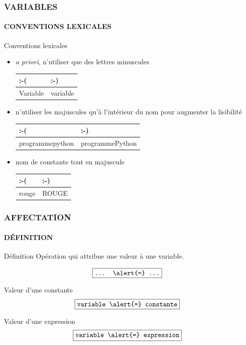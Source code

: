 \begin{frame}
\frametitle{\uppercase{Variables}}
\framesubtitle{\uppercase{Conventions lexicales}}
\begin{block}{Conventions lexicales}
\begin{itemize}
\item {\em a priori}, n'utiliser que des lettres minuscules\\
	{\tt \begin{tabular}[t]{|l|l|}
	\hline
	\alert{:-(} & \alert{:-)} \\
	\hline
	Variable & variable \\
	\hline
	\end{tabular}}
\item n'utiliser les majuscules qu'à l'intérieur du nom pour augmenter la lisibilité\\
	{\tt \begin{tabular}[t]{|l|l|}
	\hline
	\alert{:-(} & \alert{:-)} \\
	\hline
	programmepython & programmePython \\
	\hline
	\end{tabular}}
\item nom de constante tout en majuscule\\
	{\tt \begin{tabular}[t]{|l|l|}
	\hline
	\alert{:-(} & \alert{:-)} \\
	\hline
	rouge  & ROUGE \\
	\hline
	\end{tabular}}
	
\end{itemize}
\end{block}

\end{frame}
\note{}



\begin{frame}
\frametitle{\uppercase{Affectation}}
\framesubtitle{\uppercase{Définition}}
\begin{block}{Définition}
Opération qui attribue une valeur à une variable.

$$\framebox{\tt ... \alert{=} ...}$$
\end{block}
\begin{block}{Valeur d'une constante}
$$\framebox{\tt variable \alert{=} constante}$$
\end{block}
\begin{block}{Valeur d'une expression}
$$\framebox{\tt variable \alert{=} expression}$$
\end{block}

\end{frame}
\note{}


